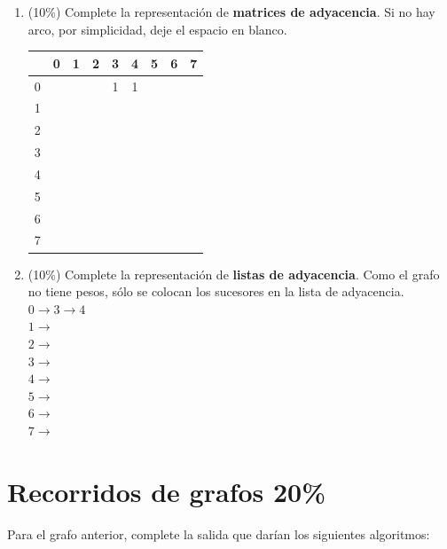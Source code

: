 \documentclass[twocolumn]{article}
\begin{document}
\begin{enumerate}[label=\Alph*]
	\item (10\%) Complete la representación de \textbf{matrices de adyacencia}. Si no hay arco,
  por simplicidad, deje el espacio en blanco.

\begin{center}
\begin{tabular}{| c | c | c | c | c | c | c | c | c |}
\hline
  & 0 & 1 & 2 & 3 & 4 & 5 & 6 & 7 \\
\hline
0 &   &   &   & 1  & 1  &   &   &   \\
\hline
1 &   &   &   &   &   &   &   &   \\
\hline
2 &   &   &   &   &   &   &   &   \\
\hline
3 &   &   &   &   &   &   &   &   \\
\hline
4 &   &   &   &   &   &   &   &   \\
\hline
5 &   &   &   &   &   &   &   &   \\
\hline
6 &   &   &   &   &   &   &   &   \\
\hline
7 &   &   &   &   &   &   &   &   \\ 
\hline
\end{tabular}
\end{center}

	\item (10\%) Complete la representación de \textbf{listas de adyacencia}. Como
  el grafo no tiene pesos, sólo se colocan los sucesores en la lista de adyacencia.\\


$0 \rightarrow 3 \rightarrow 4$\\
$1 \rightarrow$\\
$2 \rightarrow$\\
$3 \rightarrow$\\
$4 \rightarrow$\\
$5 \rightarrow$\\
$6 \rightarrow$\\
$7 \rightarrow$\\


\end{enumerate}



\section{Recorridos de grafos 20\%}

Para el grafo anterior, complete la salida
que darían los siguientes algoritmos:
\end{document}
